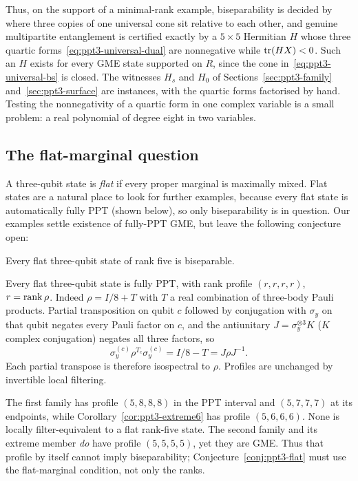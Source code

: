 Thus, on the support of a minimal-rank example, biseparability is decided by where three copies of one universal cone
sit relative to each other, and genuine multipartite entanglement is certified exactly by a $5\times5$ Hermitian $H$
whose three quartic forms~\eqref{eq:ppt3-universal-dual} are nonnegative while $\operatorname{tr}(HX)<0$. Such an $H$ exists for
every GME state supported on $R$, since the cone in~\eqref{eq:ppt3-universal-bs} is closed. The witnesses $H_s$ and $H_0$ of
Sections~\ref{sec:ppt3-family} and~\ref{sec:ppt3-surface} are instances, with the quartic forms factorised by hand.
Testing the nonnegativity of a quartic form in one complex variable is a small problem: a real polynomial of degree eight
in two variables.

\subsection{The flat-marginal question}\label{sec:ppt3-flat}

A three-qubit state is \emph{flat} if every proper marginal
is maximally mixed. Flat states are a natural place to look for further examples, because every flat state is automatically fully
PPT (shown below), so only biseparability is in question. Our examples settle existence of fully-PPT GME, but leave the following
conjecture open:
\begin{conjecture}\label{conj:ppt3-flat}
Every flat three-qubit state of rank five is biseparable.

\end{conjecture}
Every flat three-qubit state is fully PPT, with rank profile $(r,r,r,r)$, $r=\operatorname{rank}\rho$. Indeed
$\rho=I/8+T$ with $T$ a real combination of three-body Pauli products. Partial transposition on qubit $c$ followed by
conjugation with $\sigma_y$ on that qubit negates every Pauli factor on $c$, and the antiunitary
$J=\sigma_y^{\otimes3}K$ ($K$ complex conjugation) negates all three factors, so
\[
 \sigma_y^{(c)}\rho^{T_c}\sigma_y^{(c)}=I/8-T=J\rho J^{-1}.
\]
Each partial transpose is therefore isospectral to $\rho$. Profiles are unchanged by invertible local filtering.

\begin{remark}\label{rem:ppt3-flat-profile}
The first family has profile $(5,8,8,8)$ in the PPT interval
and $(5,7,7,7)$ at its endpoints, while
Corollary~\ref{cor:ppt3-extreme6} has profile $(5,6,6,6)$.
None is locally filter-equivalent to a flat rank-five state.
The second family and its extreme member \emph{do} have profile
$(5,5,5,5)$, yet they are GME. Thus that profile by itself
cannot imply biseparability; Conjecture~\ref{conj:ppt3-flat} must use the
flat-marginal condition, not only the ranks.
\end{remark}

